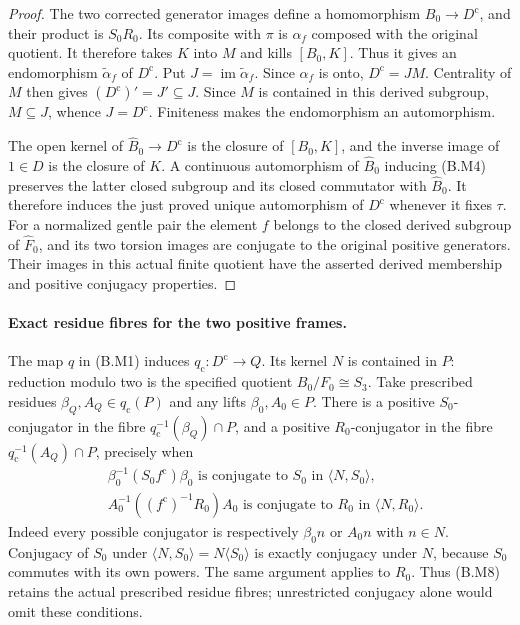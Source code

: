 \begin{proof}
The two corrected generator images define a homomorphism
$B_0\to D^{\mathrm c}$, and their product is $S_0R_0$.
Its composite with $\pi$ is $\alpha_f$ composed with the
original quotient.  It therefore takes $K$ into $M$ and
kills $[B_0,K]$.  Thus it gives an endomorphism $\widetilde
\alpha_f$ of $D^{\mathrm c}$.  Put $J=\operatorname{im}
\widetilde\alpha_f$.  Since $\alpha_f$ is onto,
$D^{\mathrm c}=JM$.  Centrality of $M$ then gives
$(D^{\mathrm c})'=J'\subseteq J$.  Since $M$ is contained
in this derived subgroup, $M\subseteq J$, whence
$J=D^{\mathrm c}$.  Finiteness makes the endomorphism an
automorphism.

The open kernel of $\widehat B_0\to D^{\mathrm c}$ is the
closure of $[B_0,K]$, and the inverse image of $1\in D$ is
the closure of $K$.  A continuous automorphism of
$\widehat B_0$ inducing (B.M4) preserves the latter closed
subgroup and its closed commutator with $\widehat B_0$.
It therefore induces the just proved unique automorphism of
$D^{\mathrm c}$ whenever it fixes $\tau$.  For a normalized
gentle pair the element $f$ belongs to the closed derived
subgroup of $\widehat F_0$, and its two torsion images are
conjugate to the original positive generators.  Their
images in this actual finite quotient have the asserted
derived membership and positive conjugacy properties.
\end{proof}

\paragraph{Exact residue fibres for the two positive frames.}
The map $q$ in (B.M1) induces $q_{\mathrm c}:D^{\mathrm c}
\to Q$.  Its kernel $N$ is contained in $P$: reduction
modulo two is the specified quotient $B_0/F_0\cong S_3$.
Take prescribed residues $\beta_Q,A_Q\in q_{\mathrm c}(P)$
and any lifts $\beta_0,A_0\in P$.  There is a positive
$S_0$-conjugator in the fibre $q_{\mathrm c}^{-1}(\beta_Q)
\cap P$, and a positive $R_0$-conjugator in the fibre
$q_{\mathrm c}^{-1}(A_Q)\cap P$, precisely when
\[
\begin{split}
 &\beta_0^{-1}(S_0 f^{\mathrm c})\beta_0
       \text{ is conjugate to }S_0
       \text{ in }\langle N,S_0\rangle,\\
 &A_0^{-1}((f^{\mathrm c})^{-1}R_0)A_0
       \text{ is conjugate to }R_0
       \text{ in }\langle N,R_0\rangle.         
\end{split}\tag{B.M8}
\]
Indeed every possible conjugator is respectively
$\beta_0n$ or $A_0n$ with $n\in N$.  Conjugacy of $S_0$
under $\langle N,S_0\rangle=N\langle S_0\rangle$ is
exactly conjugacy under $N$, because $S_0$ commutes with
its own powers.  The same argument applies to $R_0$.
Thus (B.M8) retains the actual prescribed residue fibres;
unrestricted conjugacy alone would omit these conditions.

